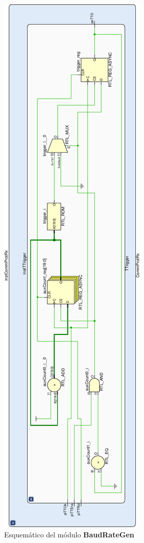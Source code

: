 \documentclass[12pt]{article}
\begin{document}
\begin{figure}[H]
    \centering
    \includegraphics[angle=270, width=\textwidth]{ttrigger-crop}
    \caption{Esquemático del módulo \textbf{BaudRateGen}}
\end{figure}
\end{document}
